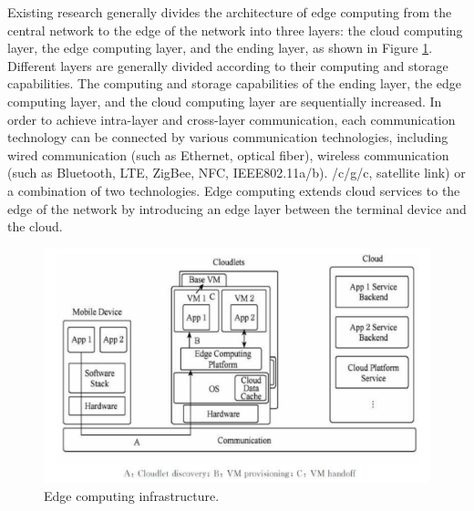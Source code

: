 Existing research generally divides the architecture of edge computing from the central network to the 
edge of the network into three layers: the cloud computing layer, the edge computing layer, and the ending
layer, as shown in Figure \ref{fig:edge_infr}. Different layers are generally divided according to their computing 
and storage capabilities. The computing and storage capabilities of the ending layer, the edge computing
layer, and the cloud computing layer are sequentially increased. In order to achieve intra-layer and
cross-layer communication, each communication technology can be connected by various communication 
technologies, including wired communication (such as Ethernet, optical fiber), wireless communication 
(such as Bluetooth, LTE, ZigBee, NFC, IEEE802.11a/b). /c/g/c, satellite link) or a combination of two 
technologies. Edge computing extends cloud services to the edge of the network by introducing an edge 
layer between the terminal device and the cloud.

\begin{figure}
    \includegraphics[width=\textwidth]{Images/Edge_infrastructure.png}
    \caption{Edge computing infrastructure.}
    \label{fig:edge_infr}
\end{figure}
